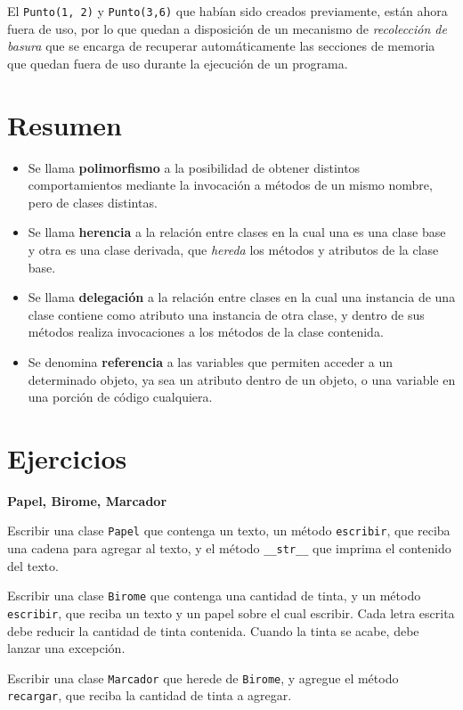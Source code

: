\begin{observacion}
El \lstinline!Punto(1, 2)! y \lstinline!Punto(3,6)! que habían sido creados
previamente, están ahora fuera de uso, por lo que quedan a disposición de un
mecanismo de \emph{recolección de basura} que se encarga de recuperar
automáticamente las secciones de memoria que quedan fuera de uso durante la
ejecución de un programa.
\end{observacion}

\section{Resumen}

\begin{itemize}
\item Se llama {\bf polimorfismo} a la posibilidad de obtener distintos
comportamientos mediante la invocación a métodos de un mismo nombre, pero de
clases distintas.

\item Se llama {\bf herencia} a la relación entre clases en la cual una es una
clase base y otra es una clase derivada, que \emph{hereda} los métodos y
atributos de la clase base.

\item Se llama {\bf delegación} a la relación entre clases en la cual una
instancia de una clase contiene como atributo una instancia de otra clase,
y dentro de sus métodos realiza invocaciones a los métodos de la clase
contenida.

\item Se denomina {\bf referencia} a las variables que permiten acceder a
un determinado objeto, ya sea un atributo dentro de un objeto, o una
variable en una porción de código cualquiera.
\end{itemize}


\newpage
\section{Ejercicios}

\begin{ejercicio}
{\bf Papel, Birome, Marcador}
\begin{partes}
    \item Escribir una clase \verb|Papel| que contenga un texto, un método
\verb|escribir|, que reciba una cadena para agregar al texto, y el método
\verb|__str__| que imprima el contenido del texto.
    \item Escribir una clase \verb|Birome| que contenga una cantidad de tinta, y
un método \verb|escribir|, que reciba un texto y un papel sobre el cual
escribir. Cada letra escrita debe reducir la cantidad de tinta contenida.
Cuando la tinta se acabe, debe lanzar una excepción.
    \item Escribir una clase \verb|Marcador| que herede de \verb|Birome|, y agregue el
método \verb|recargar|, que reciba la cantidad de tinta a agregar.
\end{partes}
\end{ejercicio}


